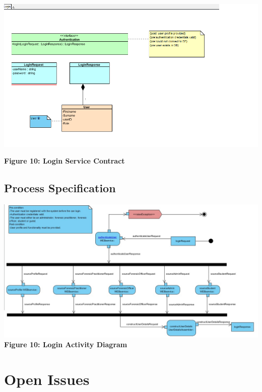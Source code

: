 \documentclass[10pt,a4paper]{article}
\begin{document}
   \begin{center}
   	\includegraphics[scale=0.4]{LoginServiceContract.png}
   	
   	\textbf{Figure 10: Login Service Contract}
   \end{center}
\subsection{Process Specification}
\begin{center}
	\includegraphics[scale=0.4]{loginActivity.jpg}
	\textbf{Figure 10: Login Activity Diagram}
\end{center}
\pagebreak

\section{Open Issues}
\end{document}
